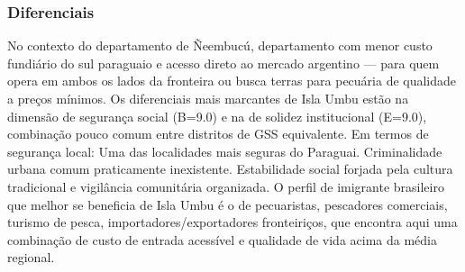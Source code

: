 \subsubsection*{Diferenciais}\label{dif-isla-umbu-1208}
No contexto do departamento de Ñeembucú, departamento com menor custo fundiário do sul paraguaio e acesso direto ao mercado argentino — para quem opera em ambos os lados da fronteira ou busca terras para pecuária de qualidade a preços mínimos. Os diferenciais mais marcantes de Isla Umbu estão na dimensão de segurança social (B=9.0) e na de solidez institucional (E=9.0), combinação pouco comum entre distritos de GSS equivalente. Em termos de segurança local: Uma das localidades mais seguras do Paraguai. Criminalidade urbana comum praticamente inexistente. Estabilidade social forjada pela cultura tradicional e vigilância comunitária organizada. O perfil de imigrante brasileiro que melhor se beneficia de Isla Umbu é o de pecuaristas, pescadores comerciais, turismo de pesca, importadores/exportadores fronteiriços, que encontra aqui uma combinação de custo de entrada acessível e qualidade de vida acima da média regional.
